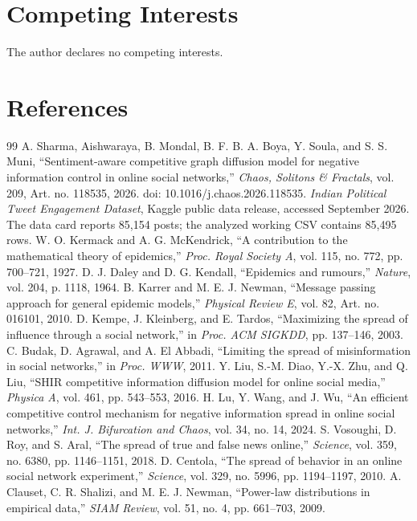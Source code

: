 \documentclass[11pt,a4paper]{article}
\begin{document}
\section*{Competing Interests}
The author declares no competing interests.

\section*{References}
\begin{thebibliography}{99}
 A. Sharma, Aishwaraya, B. Mondal, B. F. B. A. Boya, Y. Soula, and S. S. Muni, ``Sentiment-aware competitive graph diffusion model for negative information control in online social networks,'' \emph{Chaos, Solitons \& Fractals}, vol. 209, Art. no. 118535, 2026. doi: 10.1016/j.chaos.2026.118535.
 \emph{Indian Political Tweet Engagement Dataset}, Kaggle public data release, accessed September 2026. The data card reports 85,154 posts; the analyzed working CSV contains 85,495 rows.
 W. O. Kermack and A. G. McKendrick, ``A contribution to the mathematical theory of epidemics,'' \emph{Proc. Royal Society A}, vol. 115, no. 772, pp. 700--721, 1927.
 D. J. Daley and D. G. Kendall, ``Epidemics and rumours,'' \emph{Nature}, vol. 204, p. 1118, 1964.
 B. Karrer and M. E. J. Newman, ``Message passing approach for general epidemic models,'' \emph{Physical Review E}, vol. 82, Art. no. 016101, 2010.
 D. Kempe, J. Kleinberg, and E. Tardos, ``Maximizing the spread of influence through a social network,'' in \emph{Proc. ACM SIGKDD}, pp. 137--146, 2003.
 C. Budak, D. Agrawal, and A. El Abbadi, ``Limiting the spread of misinformation in social networks,'' in \emph{Proc. WWW}, 2011.
 Y. Liu, S.-M. Diao, Y.-X. Zhu, and Q. Liu, ``SHIR competitive information diffusion model for online social media,'' \emph{Physica A}, vol. 461, pp. 543--553, 2016.
 H. Lu, Y. Wang, and J. Wu, ``An efficient competitive control mechanism for negative information spread in online social networks,'' \emph{Int. J. Bifurcation and Chaos}, vol. 34, no. 14, 2024.
 S. Vosoughi, D. Roy, and S. Aral, ``The spread of true and false news online,'' \emph{Science}, vol. 359, no. 6380, pp. 1146--1151, 2018.
 D. Centola, ``The spread of behavior in an online social network experiment,'' \emph{Science}, vol. 329, no. 5996, pp. 1194--1197, 2010.
 A. Clauset, C. R. Shalizi, and M. E. J. Newman, ``Power-law distributions in empirical data,'' \emph{SIAM Review}, vol. 51, no. 4, pp. 661--703, 2009.

\end{thebibliography}
\end{document}
